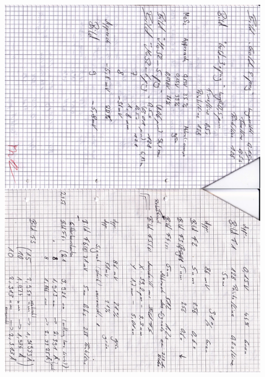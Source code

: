 \begin{appendix}
\begin{figure}[H]
\centering \includegraphics[width=\textwidth]{Bilder/Protokoll/003.png}
\end{figure}  
\begin{figure}[H]

\end{figure}
\end{appendix}
